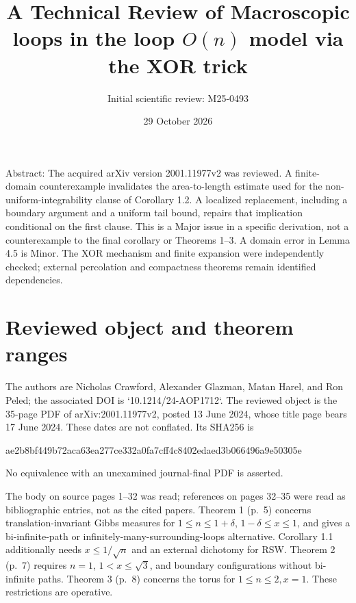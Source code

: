 \documentclass[10pt]{article}
\title{A Technical Review of
Macroscopic loops in the loop \(O(n)\) model via the XOR trick}
\author{Initial scientific review: M25-0493}
\date{29 October 2026}
\begin{document}
\maketitle
Abstract: The acquired arXiv version 2001.11977v2 was reviewed. A finite-domain counterexample invalidates the area-to-length estimate used for the non-uniform-integrability clause of Corollary 1.2. A localized replacement, including a boundary argument and a uniform tail bound, repairs that implication conditional on the first clause. This is a Major issue in a specific derivation, not a counterexample to the final corollary or Theorems 1–3. A domain error in Lemma 4.5 is Minor. The XOR mechanism and finite expansion were independently checked; external percolation and compactness theorems remain identified dependencies.\par
\section*{Reviewed object and theorem ranges}
The authors are Nicholas Crawford, Alexander Glazman, Matan Harel, and Ron Peled; the associated DOI is `10.1214/24-AOP1712`. The reviewed object is the 35-page PDF of arXiv:2001.11977v2, posted 13 June 2024, whose title page bears 17 June 2024. These dates are not conflated. Its SHA256 is\par
ae2b8bf449b72aca63ea277ce332a0fa7cff4c8402edaed3b066496a9e50305e\par
No equivalence with an unexamined journal-final PDF is asserted.\par
The body on source pages 1–32 was read; references on pages 32–35 were read as bibliographic entries, not as the cited papers. Theorem 1 (p. 5) concerns translation-invariant Gibbs measures for \(1\le n\le1+\delta\), \(1-\delta\le x\le1\), and gives a bi-infinite-path or infinitely-many-surrounding-loops alternative. Corollary 1.1 additionally needs \(x\le1/\sqrt n\) and an external dichotomy for RSW. Theorem 2 (p. 7) requires \(n=1\), \(1<x\le\sqrt3\), and boundary configurations without bi-infinite paths. Theorem 3 (p. 8) concerns the torus for \(1\le n\le2,x=1\). These restrictions are operative.\par
\end{document}
